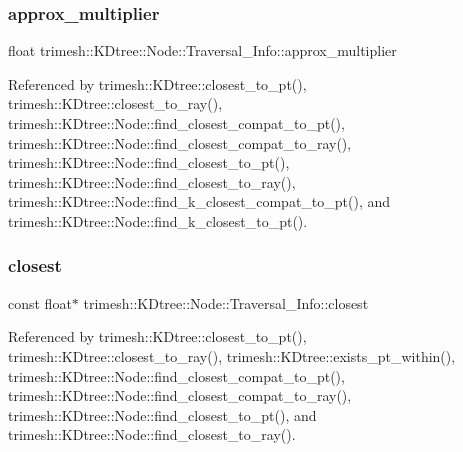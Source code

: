 \subsubsection{\texorpdfstring{approx\+\_\+multiplier}{approx\_multiplier}}
{\footnotesize\ttfamily float trimesh\+::\+K\+Dtree\+::\+Node\+::\+Traversal\+\_\+\+Info\+::approx\+\_\+multiplier}



Referenced by trimesh\+::\+K\+Dtree\+::closest\+\_\+to\+\_\+pt(), trimesh\+::\+K\+Dtree\+::closest\+\_\+to\+\_\+ray(), trimesh\+::\+K\+Dtree\+::\+Node\+::find\+\_\+closest\+\_\+compat\+\_\+to\+\_\+pt(), trimesh\+::\+K\+Dtree\+::\+Node\+::find\+\_\+closest\+\_\+compat\+\_\+to\+\_\+ray(), trimesh\+::\+K\+Dtree\+::\+Node\+::find\+\_\+closest\+\_\+to\+\_\+pt(), trimesh\+::\+K\+Dtree\+::\+Node\+::find\+\_\+closest\+\_\+to\+\_\+ray(), trimesh\+::\+K\+Dtree\+::\+Node\+::find\+\_\+k\+\_\+closest\+\_\+compat\+\_\+to\+\_\+pt(), and trimesh\+::\+K\+Dtree\+::\+Node\+::find\+\_\+k\+\_\+closest\+\_\+to\+\_\+pt().

\mbox{\label{structtrimesh_1_1KDtree_1_1Node_1_1Traversal__Info_aff348a021f69670e8c19efc5a2f2a805}} 
\subsubsection{\texorpdfstring{closest}{closest}}
{\footnotesize\ttfamily const float$\ast$ trimesh\+::\+K\+Dtree\+::\+Node\+::\+Traversal\+\_\+\+Info\+::closest}



Referenced by trimesh\+::\+K\+Dtree\+::closest\+\_\+to\+\_\+pt(), trimesh\+::\+K\+Dtree\+::closest\+\_\+to\+\_\+ray(), trimesh\+::\+K\+Dtree\+::exists\+\_\+pt\+\_\+within(), trimesh\+::\+K\+Dtree\+::\+Node\+::find\+\_\+closest\+\_\+compat\+\_\+to\+\_\+pt(), trimesh\+::\+K\+Dtree\+::\+Node\+::find\+\_\+closest\+\_\+compat\+\_\+to\+\_\+ray(), trimesh\+::\+K\+Dtree\+::\+Node\+::find\+\_\+closest\+\_\+to\+\_\+pt(), and trimesh\+::\+K\+Dtree\+::\+Node\+::find\+\_\+closest\+\_\+to\+\_\+ray().

\mbox{\label{structtrimesh_1_1KDtree_1_1Node_1_1Traversal__Info_a7d7d335558e2ce31ffaa5cc7588c1b5d}} 
